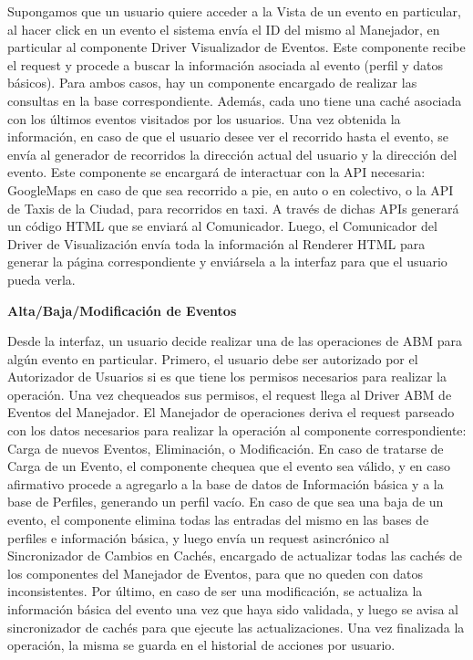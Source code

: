 Supongamos que un usuario quiere acceder a la Vista de un evento en particular, al hacer click en un evento el sistema envía el ID del mismo al Manejador, en particular al componente Driver Visualizador de Eventos. Este componente recibe el request y procede a buscar la información asociada al evento (perfil y datos básicos). Para ambos casos, hay un componente encargado de realizar las consultas en la base correspondiente. Además, cada uno tiene una caché asociada con los últimos eventos visitados por los usuarios. Una vez obtenida la información, en caso de que el usuario desee ver el recorrido hasta el evento, se envía al generador de recorridos la dirección actual del usuario y la dirección del evento. Este componente se encargará de interactuar con la API necesaria: GoogleMaps en caso de que sea recorrido a pie, en auto o en colectivo, o la API de Taxis de la Ciudad, para recorridos en taxi. A través de dichas APIs generará un código HTML que se enviará al Comunicador. Luego, el Comunicador del Driver de Visualización envía toda la información al Renderer HTML para generar la página correspondiente y enviársela a la interfaz para que el usuario pueda verla.

\textbf{Alta/Baja/Modificación de Eventos}

Desde la interfaz, un usuario decide realizar una de las operaciones de ABM para algún evento en particular. Primero, el usuario debe ser autorizado por el Autorizador de Usuarios si es que tiene los permisos necesarios para realizar la operación. Una vez chequeados sus permisos, el request llega al Driver ABM de Eventos del Manejador. El Manejador de operaciones deriva el request parseado con los datos necesarios para realizar la operación al componente correspondiente: Carga de nuevos Eventos, Eliminación, o Modificación.
En caso de tratarse de Carga de un Evento, el componente chequea que el evento sea válido, y en caso afirmativo procede a agregarlo a la base de datos de Información básica y a la base de Perfiles, generando un perfil vacío.
En caso de que sea una baja de un evento, el componente elimina todas las entradas del mismo en las bases de perfiles e información básica, y luego envía un request asincrónico al Sincronizador de Cambios en Cachés, encargado de actualizar todas las cachés de los componentes del Manejador de Eventos, para que no queden con datos inconsistentes.
Por último, en caso de ser una modificación, se actualiza la información básica del evento una vez que haya sido validada, y luego se avisa al sincronizador de cachés para que ejecute las actualizaciones.
Una vez finalizada la operación, la misma se guarda en el historial de acciones por usuario.

